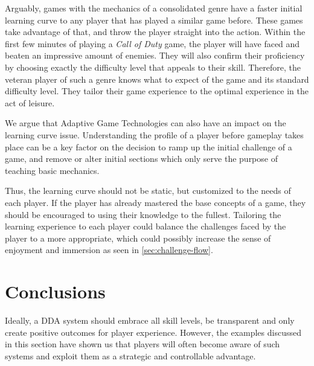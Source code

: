 Arguably, games with the mechanics of a consolidated genre have a faster initial learning curve to any player that has played a similar game before. These games take advantage of that, and throw the player straight into the action. Within the first few minutes of playing a \emph{Call of Duty} game, the player will have faced and beaten an impressive amount of enemies. They will also confirm their proficiency by choosing exactly the difficulty level that appeals to their skill. Therefore, the veteran player of such a genre knows what to expect of the game and its standard difficulty level. They tailor their game experience to the optimal experience in the act of leisure.

We argue that Adaptive Game Technologies can also have an impact on the learning curve issue. Understanding the profile of a player before gameplay takes place can be a key factor on the decision to ramp up the initial challenge of a game, and remove or alter initial sections which only serve the purpose of teaching basic mechanics.

Thus, the learning curve should not be static, but customized to the needs of each player. If the player has already mastered the base concepts of a game, they should be encouraged to using their knowledge to the fullest. Tailoring the learning experience to each player could balance the challenges faced by the player to a more appropriate, which could possibly increase the sense of enjoyment and immersion as seen in \autoref{sec:challenge-flow}.

\section{Conclusions}

Ideally, a DDA system should embrace all skill levels, be transparent and only create positive outcomes for player experience. However, the examples discussed in this section have shown us that players will often become aware of such systems and exploit them as a strategic and controllable advantage. 